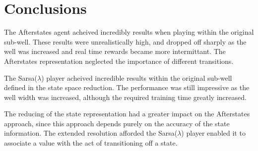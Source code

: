 \documentclass{rucsthesis}
\begin{document}
\chapter{Conclusions}

The Afterstates agent acheived incredibly results when playing within the original sub-well. These results were unrealistically high, and dropped off sharply as the well was increased and real time rewards became more intermittant. The Afterstates representation neglected the importance of different transitions.

The Sarsa($\lambda$) player acheived incredible results within the original sub-well defined in the state space reduction. The performance was still impressive as the well width was increased, although the required training time greatly increased.

The reducing of the state representation had a greater impact on the Afterstates approach, since this approach depends purely on the accuracy of the state information. The extended resolution afforded the Sarsa($\lambda$) player enabled it to associate a value with the act of transitioning off a state. 


\end{document}
